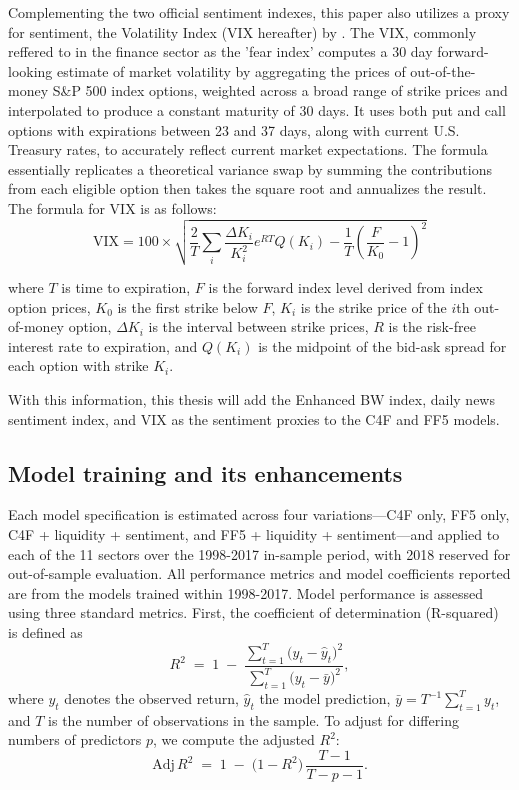 Complementing the two official sentiment indexes, this paper also utilizes a proxy for sentiment, the Volatility Index (VIX hereafter) by . The VIX, commonly reffered to in the finance sector as the 'fear index' computes a 30 day forward-looking estimate of market volatility by aggregating the prices of out-of-the-money S\&P 500 index options, weighted across a broad range of strike prices and interpolated to produce a constant maturity of 30 days. It uses both put and call options with expirations between 23 and 37 days, along with current U.S. Treasury rates, to accurately reflect current market expectations. The formula essentially replicates a theoretical variance swap by summing the contributions from each eligible option then takes the square root and annualizes the result. The formula for VIX is as follows:
\begin{equation}
    \label{eq:vix}
    \text{VIX} = 100 \times \sqrt{\frac{2}{T} \sum_i \frac{\Delta K_i}{K_i^2} e^{RT} Q(K_i) - \frac{1}{T} \left(\frac{F}{K_0} - 1\right)^2}
\end{equation}

where $T$ is time to expiration, $F$ is the forward index level derived from index option prices, $K_0$ is the first strike below $F$, $K_i$ is the strike price of the $i$th out-of-money option, $\Delta K_i$ is the interval between strike prices, $R$ is the risk-free interest rate to expiration, and $Q(K_i)$ is the midpoint of the bid-ask spread for each option with strike $K_i$.

With this information, this thesis will add the Enhanced BW index, daily news sentiment index, and VIX as the sentiment proxies to the C4F and FF5 models.

\subsection{Model training and its enhancements}

Each model specification is estimated across four variations—C4F only, FF5 only, C4F + liquidity + sentiment, and FF5 + liquidity + sentiment—and applied to each of the 11 sectors over the 1998-2017 in-sample period, with 2018 reserved for out-of-sample evaluation. All performance metrics and model coefficients reported are from the models trained within 1998-2017. Model performance is assessed using three standard metrics.  First, the coefficient of determination (R-squared) is defined as  
\begin{equation}
\label{eq:rsquared}
R^2 \;=\; 1 \;-\; \frac{\sum_{t=1}^{T}\bigl(y_{t}-\hat y_{t}\bigr)^2}{\sum_{t=1}^{T}\bigl(y_{t}-\bar y\bigr)^2},
\end{equation}  
where \(y_t\) denotes the observed return, \(\hat y_t\) the model prediction, \(\bar y = T^{-1}\sum_{t=1}^T y_t\), and \(T\) is the number of observations in the sample.  To adjust for differing numbers of predictors \(p\), we compute the adjusted \(R^2\):  
\begin{equation}
\label{eq:adjrsquared}
\mathrm{Adj}\,R^2 \;=\; 1 \;-\; \bigl(1 - R^2\bigr)\,\frac{T - 1}{T - p - 1}.
\end{equation}  

